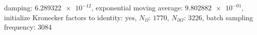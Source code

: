 damping: $\num[scientific-notation=true]{6.289322e-12}$, exponential moving average: $\num[scientific-notation=true]{9.802882e-01}$, initialize Kronecker factors to identity: $\text{yes}$, $N_{\Omega}$: $\num[scientific-notation=false]{1770}$, $N_{\partial\Omega}$: $\num[scientific-notation=false]{3226}$, batch sampling frequency: $\num[scientific-notation=false]{3084}$